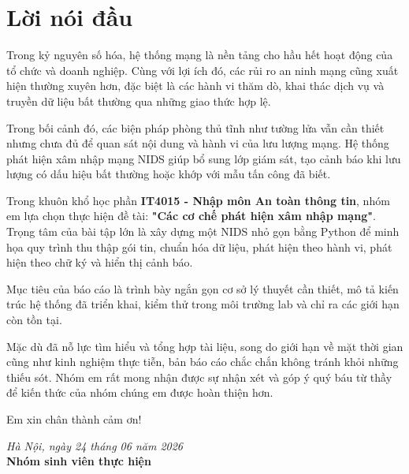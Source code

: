 \chapter*{Lời nói đầu}

Trong kỷ nguyên số hóa, hệ thống mạng là nền tảng cho hầu hết hoạt động của tổ chức và doanh nghiệp. Cùng với lợi ích đó, các rủi ro an ninh mạng cũng xuất hiện thường xuyên hơn, đặc biệt là các hành vi thăm dò, khai thác dịch vụ và truyền dữ liệu bất thường qua những giao thức hợp lệ.

Trong bối cảnh đó, các biện pháp phòng thủ tĩnh như tường lửa vẫn cần thiết nhưng chưa đủ để quan sát nội dung và hành vi của lưu lượng mạng. Hệ thống phát hiện xâm nhập mạng NIDS giúp bổ sung lớp giám sát, tạo cảnh báo khi lưu lượng có dấu hiệu bất thường hoặc khớp với mẫu tấn công đã biết.

Trong khuôn khổ học phần \textbf{IT4015 - Nhập môn An toàn thông tin}, nhóm em lựa chọn thực hiện đề tài: \textbf{"Các cơ chế phát hiện xâm nhập mạng"}. Trọng tâm của bài tập lớn là xây dựng một NIDS nhỏ gọn bằng Python để minh họa quy trình thu thập gói tin, chuẩn hóa dữ liệu, phát hiện theo hành vi, phát hiện theo chữ ký và hiển thị cảnh báo.

Mục tiêu của báo cáo là trình bày ngắn gọn cơ sở lý thuyết cần thiết, mô tả kiến trúc hệ thống đã triển khai, kiểm thử trong môi trường lab và chỉ ra các giới hạn còn tồn tại.

Mặc dù đã nỗ lực tìm hiểu và tổng hợp tài liệu, song do giới hạn về mặt thời gian cũng như kinh nghiệm thực tiễn, bản báo cáo chắc chắn không tránh khỏi những thiếu sót. Nhóm em rất mong nhận được sự nhận xét và góp ý quý báu từ thầy để kiến thức của nhóm chúng em được hoàn thiện hơn.

Em xin chân thành cảm ơn!

\vspace{1.5cm} %
\begin{flushright}
    \textit{Hà Nội, ngày 24 tháng 06 năm 2026} \\
    \vspace{0.2cm}
    \textbf{Nhóm sinh viên thực hiện} \\
    \vspace{0.5cm}
    \textbf{} 
\end{flushright}
